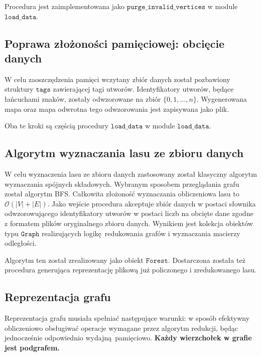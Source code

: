 \documentclass[a4paper,10pt]{article}
\begin{document}
Procedura jest zaimplementowana jako $\texttt{purge\_invalid\_vertices}$ w module $\texttt{load\_data}$.

\subsection{Poprawa złożoności pamięciowej: obcięcie danych}

W celu zaoszczędzenia pamięci wczytany zbiór danych został pozbawiony struktury $\texttt{tags}$ zawierającej tagi utworów. Identyfikatory utworów, będące łańcuchami znaków, zostały odwzorowane na zbiór $\{0, 1, \dots , n\}$. Wygenerowana mapa oraz mapa odwrotna tego odwzorowania jest zapisywana jako plik.

Oba te kroki są częścią procedury $\texttt{load\_data}$ w module $\texttt{load\_data}$.

\subsection{Algorytm wyznaczania lasu ze zbioru danych}

W celu wyznaczenia lasu ze zbioru danych zastosowany został klasyczny algorytm wyznaczania spójnych składowych. Wybranym sposobem przeglądania grafu został algorytm BFS. Całkowita złożoność wyznaczania obliczeniowa lasu to $\mathcal{O}\left(\left|V\right| + \left|E\right|\right)$. Jako wejście procedura akceptuje zbiór danych w postaci słownika odwzorowującego identyfikatory utworów w postaci liczb na obcięte dane zgodne z formatem plików oryginalnego zbioru danych. Wynikiem jest kolekcja obiektów typu $\texttt{Graph}$ realizujących logikę redukowania grafów i wyznaczania macierzy odległości.

Algorytm ten został zrealizowany jako obiekt $\texttt{Forest}$. Dostarczona została też procedura generująca reprezentację plikową już policzonego i zredukowanego lasu.

\subsection{Reprezentacja grafu}

Reprezentacja grafu musiała spełniać następujące warunki: w sposób efektywny obliczeniowo obsługiwać operacje wymagane przez algorytm redukcji, będąc jednocześnie odpowiednio wydajną pamięciowo. \textbf{Każdy wierzchołek w grafie jest podgrafem.}
\end{document}
